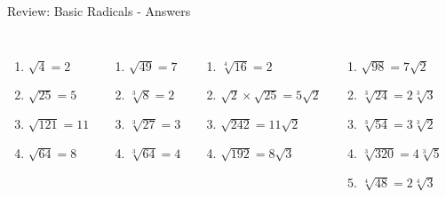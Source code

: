 \documentclass[aspectratio=169]{beamer}
\begin{document}
\begin{frame}{Review: Basic Radicals - Answers}
\begin{tcolorbox}[colback=lightgray,colframe=accent,title=Solutions]
\footnotesize
\begin{columns}[T]
\begin{enumerate}
  \item $\sqrt{4} = 2$
  \item $\sqrt{25} = 5$
  \item $\sqrt{121} = 11$
  \item $\sqrt{64} = 8$
\end{enumerate}
\begin{enumerate}
  \item $\sqrt{49} = 7$
  \item $\sqrt[3]{8} = 2$
  \item $\sqrt[3]{27} = 3$
  \item $\sqrt[3]{64} = 4$
\end{enumerate}
\begin{enumerate}
  \item $\sqrt[4]{16} = 2$
  \item $\sqrt{2} \times \sqrt{25} = 5\sqrt{2}$
  \item $\sqrt{242} = 11\sqrt{2}$
  \item $\sqrt{192} = 8\sqrt{3}$
\end{enumerate}
\begin{enumerate}
  \item $\sqrt{98} = 7\sqrt{2}$
  \item $\sqrt[3]{24} = 2\sqrt[3]{3}$
  \item $\sqrt[3]{54} = 3\sqrt[3]{2}$
  \item $\sqrt[3]{320} = 4\sqrt[3]{5}$
  \item $\sqrt[4]{48} = 2\sqrt[4]{3}$
\end{enumerate}
\end{columns}
\end{tcolorbox}
\end{frame}
\end{document}
